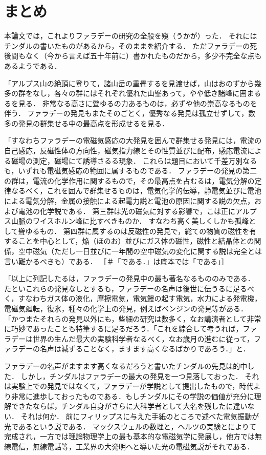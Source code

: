 \chapter{まとめ} \label{chap:summary}

本論文では，これよりファラデーの研究の全般を窺（うかが）った．
それにはチンダルの書いたものがあるから，そのままを紹介する．
ただファラデーの死後間もなく（今から言えば五十年前に）書かれたものだから，多少不完全な点もあるようである．

「アルプス山の絶頂に登りて，諸山岳の重畳するを見渡せば，山はおのずから幾多の群をなし，各々の群にはそれぞれ優れた山峯あって，やや低き諸峰に囲まるるを見る．
非常なる高さに聳ゆるの力あるものは，必ずや他の崇高なるものを伴う．
ファラデーの発見もまたそのごとく，優秀なる発見は孤立せずして，数多の発見の群集せる中の最高点を形成せるを見る．

「すなわちファラデーの電磁気感応の大発見を囲んで群集せる発見には，電流の自己感応，反磁性体の方向性，磁気指力線とその性質並びに配布，感応電流による磁場の測定，磁場にて誘導さるる現象．
これらは題目において千差万別なるも，いずれも電磁気感応の範囲に属するものである．
ファラデーの発見の第二の群は，電流の化学作用に関するもので，その最高点を占むるは，電気分解の定律なるべく，これを囲んで群集せるものは，電気化学的伝導，静電気並びに電池による電気分解，金属の接触による起電力説と電池の原因に関する説の欠点，および電池の化学説である．
第三群は光の磁気に対する影響で，こは正にアルプス山脈のワイスホルン峰に比すべきものか．
すなわち高く美しくしかも孤峰として聳ゆるもの．
第四群に属するのは反磁性の発見で，総ての物質の磁性を有することを中心として，焔（ほのお）並びにガス体の磁性，磁性と結晶体との関係，空中磁気（ただし一日並びに一年間の空中磁気の変化に関する説は完全とは言い難かるべきも）である．
［＃「である．」は底本では「である」］

「以上に列記したるは，ファラデーの発見中の最も著名なるもののみである．
たといこれらの発見なしとするも，ファラデーの名声は後世に伝うるに足るべく，すなわちガス体の液化，摩擦電気，電気鰻の起す電気，水力による発電機，電磁気廻転，復氷，種々の化学上の発見，例えばベンジンの発見等がある．
「かつまたそれらの発見以外にも，些細の研究は数多く，なお講演者として非常に巧妙であったことも特筆するに足るだろう．「これを綜合して考うれば，ファラデーは世界の生んだ最大の実験科学者なるべく，なお歳月の進むに従って，ファラデーの名声は減ずることなく，ますます高くなるばかりであろう．」と．

ファラデーの名声がますます高くなるだろうと書いたチンダルの先見は的中した．
しかし，チンダルはファラデーの最大の発見を一つ見落しておった．
それは実験上での発見ではなくて，ファラデーが学説として提出したもので，時代より非常に進歩しておったものである．もしチンダルにその学説の価値が充分に理解できたならば，チンダル自身がさらに大科学者として大名を残したに違いない．
それは何か．
前にフィリップスに与えた手紙のところで述べた電気振動が光であるという説である．
マックスウェルの数理と，ヘルツの実験とによりて完成され，一方では理論物理学上の最も基本的な電磁気学に発展し，他方では無線電信，無線電話等，工業界の大発明へと導いた光の電磁気説がそれである．
